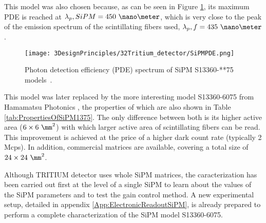 This model was also chosen because, as can be seen in Figure \ref{fig:PDESiPM}, its maximum PDE is reached at $\lambda_p,SiPM=450~\nano\meter$, which is very close to the peak of the emission spectrum of the scintillating fibers used, $\lambda_p,f=435~\nano\meter$.

\begin{figure}[htbp]
\centering
\texttt{[image: 3DesignPrinciples/32Tritium\_detector/SiPMPDE.png]}
\caption{Photon detection efficiency (PDE) spectrum of SiPM S13360-**75 models~\cite{DataSheetHammamatsu_1_SiPM_1375}.\label{fig:PDESiPM}}
\end{figure}

This model was later replaced by the more interesting model S13360-6075 from Hamamatsu Photonics \cite{DataSheetHammamatsu_1_SiPM_75}, the properties of which are also shown in Table \ref{tab:PropertiesOfSiPM1375}. The only difference between both is its higher active area ($6\times6~\mm^2$) with which larger active area of scintillating fibers can be read. This improvement is achieved at the price of a higher dark count rate (typically 2 Mcps). In addition, commercial matrices are available, covering a total size of $24\times24~\mm^2$.

Although TRITIUM detector uses whole SiPM matrices, the caracterization has been carried out first at the level of a single SiPM to learn about the values of the SiPM parameters and to test the gain control method. A new experimental setup, detailed in appendix \ref{App:ElectronicReadoutSiPM}, is already  prepared to perform a complete characterization of the SiPM model S13360-6075.